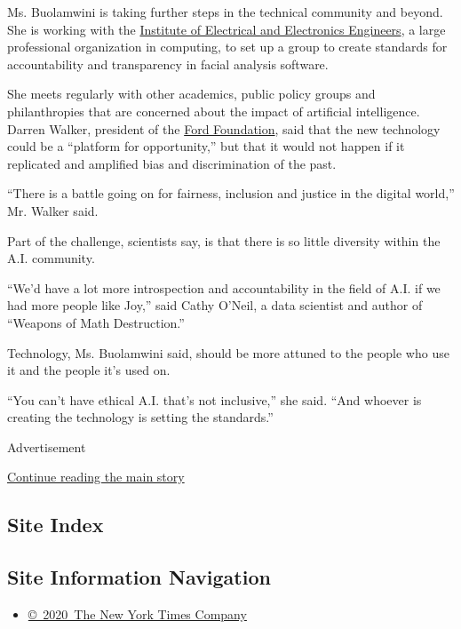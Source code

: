 Ms. Buolamwini is taking further steps in the technical community and
beyond. She is working with the
\href{https://www.ieee.org/index.html}{Institute of Electrical and
Electronics Engineers}, a large professional organization in computing,
to set up a group to create standards for accountability and
transparency in facial analysis software.

She meets regularly with other academics, public policy groups and
philanthropies that are concerned about the impact of artificial
intelligence. Darren Walker, president of the
\href{https://www.fordfoundation.org/}{Ford Foundation}, said that the
new technology could be a ``platform for opportunity,'' but that it
would not happen if it replicated and amplified bias and discrimination
of the past.

``There is a battle going on for fairness, inclusion and justice in the
digital world,'' Mr. Walker said.

Part of the challenge, scientists say, is that there is so little
diversity within the A.I. community.

``We'd have a lot more introspection and accountability in the field of
A.I. if we had more people like Joy,'' said Cathy O'Neil, a data
scientist and author of ``Weapons of Math Destruction.''

Technology, Ms. Buolamwini said, should be more attuned to the people
who use it and the people it's used on.

``You can't have ethical A.I. that's not inclusive,'' she said. ``And
whoever is creating the technology is setting the standards.''

Advertisement

\protect\hyperlink{after-bottom}{Continue reading the main story}

\hypertarget{site-index}{%
\subsection{Site Index}\label{site-index}}

\hypertarget{site-information-navigation}{%
\subsection{Site Information
Navigation}\label{site-information-navigation}}

\begin{itemize}
\tightlist
\item
  \href{https://help.nytimes3xbfgragh.onion/hc/en-us/articles/115014792127-Copyright-notice}{©~2020~The
  New York Times Company}
\end{itemize}

